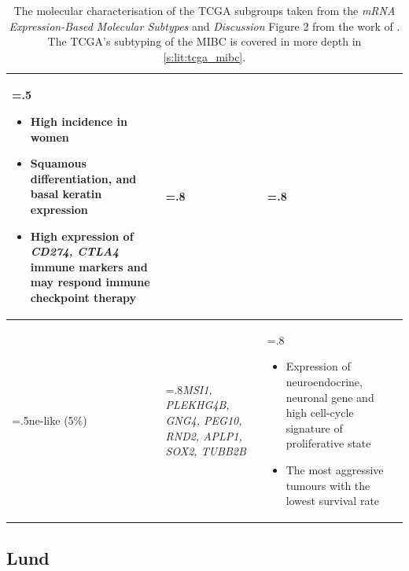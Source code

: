 \begin{table}[H]
\begin{tabularx}{\textwidth}{ >{\hsize=.5\hsize}X |>{\hsize=.8\hsize}X |>{\hsize=.8\hsize}X
    }
\begin{itemize}[leftmargin=*, nosep, after=\vspace{-\baselineskip}, before=\vspace{-.6\baselineskip}]
        \item High incidence in women
        \item Squamous differentiation, and basal keratin expression
        \item High expression of \textit{CD274, CTLA4} immune markers and may respond immune checkpoint therapy
    \end{itemize} \\
    \midrule
    \acrlong{ne-like} (5\%) &\textit{MSI1, PLEKHG4B, GNG4, PEG10, RND2, APLP1, SOX2, TUBB2B} & 
    \begin{itemize}[leftmargin=*, nosep, after=\vspace{-\baselineskip}, before=\vspace{-.6\baselineskip}]
        \item Expression of neuroendocrine, neuronal gene and high cell-cycle signature of proliferative state
        \item The most aggressive tumours with the lowest survival rate
    \end{itemize} \\
    \bottomrule
    \end{tabularx}
    \caption{The molecular characterisation of the TCGA subgroups taken from the \textit{mRNA Expression-Based Molecular Subtypes} and \textit{Discussion} Figure 2 from the work of \cite{Robertson2017-mg}. The TCGA's subtyping of the MIBC is covered in more depth in \cref{s:lit:tcga_mibc}.}
    \label{tab:lit:tcga_genes}
\end{table}

\subsection{Lund}

